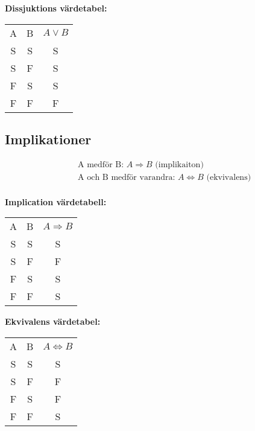 \begin{multicols}{2}
\textbf{Dissjuktions värdetabel:}\par
\begin{center}
\begin{tabular}{ |c|c|c| } 
 \hline
 A  & B  & \(A \lor B\) \\ 
 S  & S  & S          \\ 
 S  & F  & S          \\  
 F  & S  & S          \\ 
 F  & F  & F          \\ 
 \hline
\end{tabular}
\end{center}



\subsection{Implikationer}
\begin{align*}
  &\quad \text{A medför B: } A \Rightarrow B \text{ (implikaiton)} \\
  &\quad \text{A och B medför varandra: } A \Leftrightarrow B \text{ (ekvivalens)} \\
\end{align*}


\textbf{Implication värdetabell:}\par
\begin{center}
\begin{tabular}{ |c|c|c| } 
 \hline
 A  & B  & \(A \Rightarrow B\) \\ 
 S  & S  & S          \\ 
 S  & F  & F          \\  
 F  & S  & S          \\ 
 F  & F  & S          \\ 
 \hline
\end{tabular}
\end{center}

\textbf{Ekvivalens värdetabel:}\par
\begin{center}
\begin{tabular}{ |c|c|c| } 
 \hline
 A  & B  & \(A \Leftrightarrow B\) \\ 
 S  & S  & S          \\ 
 S  & F  & F          \\  
 F  & S  & F          \\ 
 F  & F  & S          \\ 
 \hline
\end{tabular}
\end{center}



\end{multicols}
